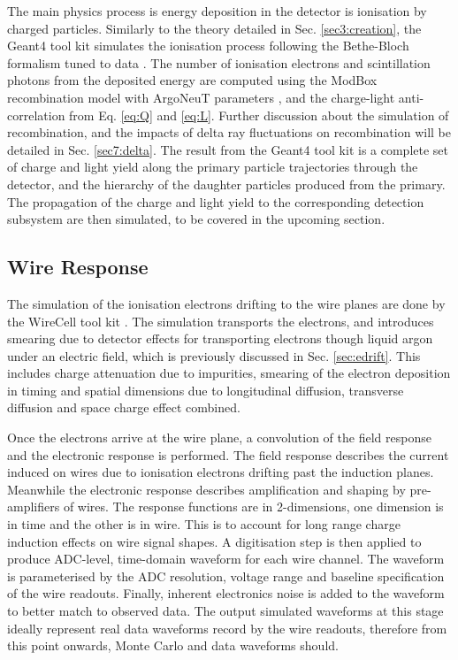 The main physics process is energy deposition in the detector is ionisation by charged particles.
Similarly to the theory detailed in Sec. \ref{sec3:creation}, the Geant4 tool kit simulates the ionisation process following the Bethe-Bloch formalism tuned to data \cite{geant4_ions}.
The number of ionisation electrons and scintillation photons from the deposited energy are computed using the ModBox recombination model with ArgoNeuT parameters \cite{argoneut_recomb}, and the charge-light anti-correlation from Eq. \ref{eq:Q} and \ref{eq:L}. 
Further discussion about the simulation of recombination, and the impacts of delta ray fluctuations on recombination will be detailed in Sec. \ref{sec7:delta}.
The result from the Geant4 tool kit is a complete set of charge and light yield along the primary particle trajectories through the detector, and the hierarchy of the daughter particles produced from the primary.
The propagation of the charge and light yield to the corresponding detection subsystem are then simulated, to be covered in the upcoming section.

\subsection{Wire Response}

The simulation of the ionisation electrons drifting to the wire planes are done by the WireCell tool kit \cite{wirecell}.
The simulation transports the electrons, and introduces smearing due to detector effects for transporting electrons though liquid argon under an electric field, which is previously discussed in Sec. \ref{sec:edrift}.
This includes charge attenuation due to impurities, smearing of the electron deposition in timing and spatial dimensions due to longitudinal diffusion, transverse diffusion and space charge effect combined.

Once the electrons arrive at the wire plane, a convolution of the field response and the electronic response is performed.
The field response describes the current induced on wires due to ionisation electrons drifting past the induction planes.
Meanwhile the electronic response describes amplification and shaping by pre-amplifiers of wires.
The response functions are in 2-dimensions, one dimension is in time and the other is in wire.
This is to account for long range charge induction effects on wire signal shapes.
A digitisation step is then applied to produce ADC-level, time-domain waveform for each wire channel.
The waveform is parameterised by the ADC resolution, voltage range and baseline specification of the wire readouts. 
Finally, inherent electronics noise is added to the waveform to better match to observed data.
The output simulated waveforms at this stage ideally represent real data waveforms record by the wire readouts, therefore from this point onwards, Monte Carlo and data waveforms should.

